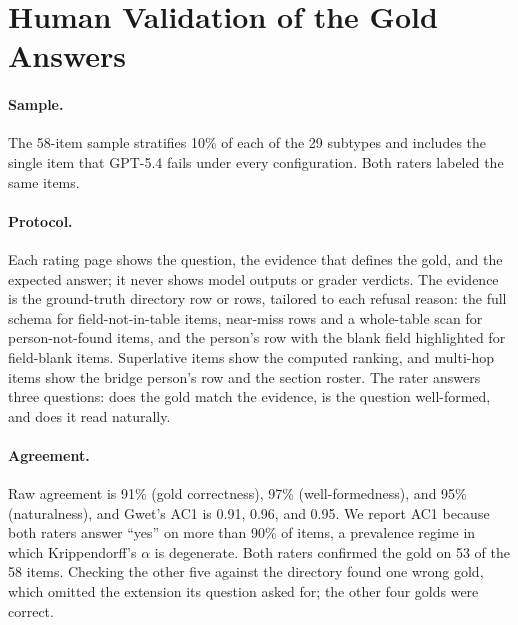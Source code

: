 \documentclass[11pt]{article}
\begin{document}
\begin{table}[h]
\centering
\footnotesize
\setlength{\tabcolsep}{3pt}

\caption{Failure types per model variant, summed over the four tool configurations.}
\label{tab:failmodes}
\end{table}

\section{Human Validation of the Gold Answers}
\label{app:human}

\paragraph{Sample.} The 58-item sample stratifies 10\% of each of the 29 subtypes and includes the single
item that GPT-5.4 fails under every configuration. Both raters labeled the same items.

\paragraph{Protocol.} Each rating page shows the question, the evidence that defines the gold, and the
expected answer; it never shows model outputs or grader verdicts. The evidence is the ground-truth
directory row or rows, tailored to each refusal reason: the full schema for field-not-in-table items,
near-miss rows and a whole-table scan for person-not-found items, and the person's row with the blank
field highlighted for field-blank items. Superlative items show the computed ranking, and multi-hop items
show the bridge person's row and the section roster. The rater answers three questions: does the gold
match the evidence, is the question well-formed, and does it read naturally.

\paragraph{Agreement.} Raw agreement is 91\% (gold correctness), 97\% (well-formedness), and 95\%
(naturalness), and Gwet's AC1 is 0.91, 0.96, and 0.95. We report AC1 because both raters answer ``yes''
on more than 90\% of items, a prevalence regime in which Krippendorff's $\alpha$ is degenerate. Both
raters confirmed the gold on 53 of the 58 items. Checking the other five against the directory found one
wrong gold, which omitted the extension its question asked for; the other four golds were correct.
\end{document}
